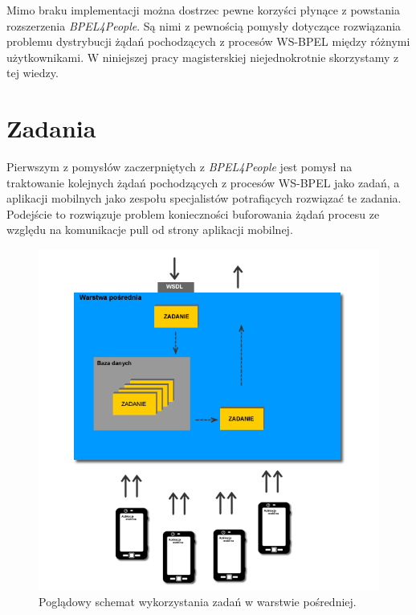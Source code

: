 Mimo braku implementacji można dostrzec pewne korzyści płynące z powstania rozszerzenia \textit{BPEL4People}. Są nimi z pewnością pomysły dotyczące rozwiązania problemu dystrybucji żądań pochodzących z procesów WS-BPEL między różnymi użytkownikami. W niniejszej pracy magisterskiej niejednokrotnie skorzystamy z tej wiedzy. 


\section{Zadania}
\label{sec:tasks}

Pierwszym z pomysłów zaczerpniętych z \textit{BPEL4People} jest pomysł na traktowanie kolejnych żądań pochodzących z procesów WS-BPEL jako zadań, a aplikacji mobilnych jako zespołu specjalistów potrafiących rozwiązać te zadania. Podejście to rozwiązuje problem konieczności buforowania żądań procesu ze względu na komunikacje pull od strony aplikacji mobilnej. 

\begin{figure}[h]
\centerline{\includegraphics[scale=0.5]{middlewareTasksConceptDiagram}}
\caption{Poglądowy schemat wykorzystania zadań w warstwie pośredniej.}
\label{fig:middlewareTasksConceptDiagram}
\end{figure}


